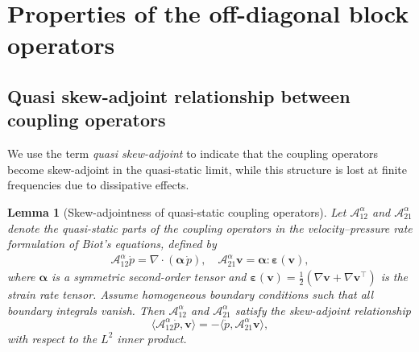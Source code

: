 \documentclass[pdflatex,sn-mathphys-num]{sn-jnl}
\theoremstyle{thmstyleone}%
\theoremstyle{thmstyletwo}%
\theoremstyle{thmstylethree}%
\newtheorem{lemma}[theorem]{Lemma}
\theoremstyle{definition}
\begin{document}
	\section{Properties of the off-diagonal block operators}\label{sec: appendix A}
	
	\subsection{Quasi skew-adjoint relationship between coupling operators}
	
	We use the term \emph{quasi skew-adjoint} to indicate that the coupling operators become skew-adjoint in the quasi-static limit, while this structure is lost at finite frequencies due to dissipative effects.
	\color{black}
	
	
	\begin{lemma}[Skew-adjointness of quasi-static coupling operators]\label{lem: adjoint skew}
		Let $\mathcal{A}_{12}^{\alpha}$ and $\mathcal{A}_{21}^{\alpha}$ denote the quasi-static parts of the coupling operators in the velocity--pressure rate formulation of Biot's equations, defined by
		\begin{align*}
			\mathcal{A}_{12}^{\alpha}\dot{p} = \nabla \cdot (\boldsymbol{\alpha}\,\dot{p}),\quad
			\mathcal{A}_{21}^{\alpha}\mathbf{v} = \boldsymbol{\alpha} : \boldsymbol{\varepsilon}(\mathbf{v}),
		\end{align*}
		where $\boldsymbol{\alpha}$ is a symmetric second-order tensor and $\boldsymbol{\varepsilon}(\mathbf{v}) = \tfrac{1}{2}(\nabla \mathbf{v} + \nabla \mathbf{v}^\top)$ is the strain rate tensor. Assume homogeneous boundary conditions such that all boundary integrals vanish. Then $\mathcal{A}_{12}^{\alpha}$ and $\mathcal{A}_{21}^{\alpha}$ satisfy the skew-adjoint relationship
		\[
		\langle \mathcal{A}_{12}^{\alpha}\dot{p}, \mathbf{v} \rangle = - \langle \dot{p}, \mathcal{A}_{21}^{\alpha}\mathbf{v} \rangle,
		\]
		with respect to the $L^2$ inner product.
	\end{lemma}
	
\end{document}
